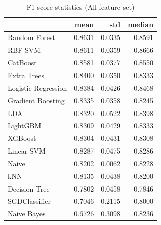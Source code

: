 \begin{table}
\caption{F1-score statistics (All feature set)}
\label{tab:f1_All_stats}
\begin{tabular}{lrrr}
\toprule
 & mean & std & median \\
\midrule
Random Forest & 0.8631 & 0.0335 & 0.8591 \\
RBF SVM & 0.8611 & 0.0359 & 0.8666 \\
CatBoost & 0.8581 & 0.0377 & 0.8550 \\
Extra Trees & 0.8400 & 0.0350 & 0.8333 \\
Logistic Regression & 0.8384 & 0.0426 & 0.8468 \\
Gradient Boosting & 0.8335 & 0.0358 & 0.8245 \\
LDA & 0.8320 & 0.0522 & 0.8398 \\
LightGBM & 0.8309 & 0.0429 & 0.8333 \\
XGBoost & 0.8304 & 0.0431 & 0.8308 \\
Linear SVM & 0.8287 & 0.0475 & 0.8286 \\
Naive & 0.8202 & 0.0062 & 0.8228 \\
kNN & 0.8135 & 0.0438 & 0.8200 \\
Decision Tree & 0.7802 & 0.0458 & 0.7846 \\
SGDClassifier & 0.7046 & 0.2115 & 0.8000 \\
Naive Bayes & 0.6726 & 0.3098 & 0.8236 \\
\bottomrule
\end{tabular}
\end{table}
